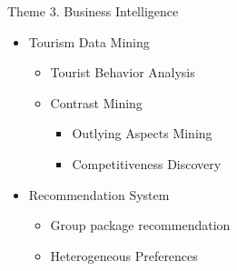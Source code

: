 \documentclass[
 size=14pt,
 paper=smartboard,  %
 mode=present, 		%
 display=slides, 	%
 style=tuliplab,  	%
 pauseslide,
 fleqn,leqno]{powerdot}{}
\begin{document}



\begin{slide}{Theme 3. Business Intelligence}
	
	\begin{itemize}
		\item Tourism Data Mining
		
		\begin{itemize}
			\item Tourist Behavior Analysis
			
			\item Contrast Mining
			
			\begin{itemize}
				
				\item Outlying Aspects Mining
				
				\item Competitiveness Discovery
				
			\end{itemize}
			
		\end{itemize}
		
		\item Recommendation System
		\begin{itemize}
			\item Group package recommendation
			\item Heterogeneous Preferences
		\end{itemize}
		
	\end{itemize}
	
\end{slide}
\end{document}
